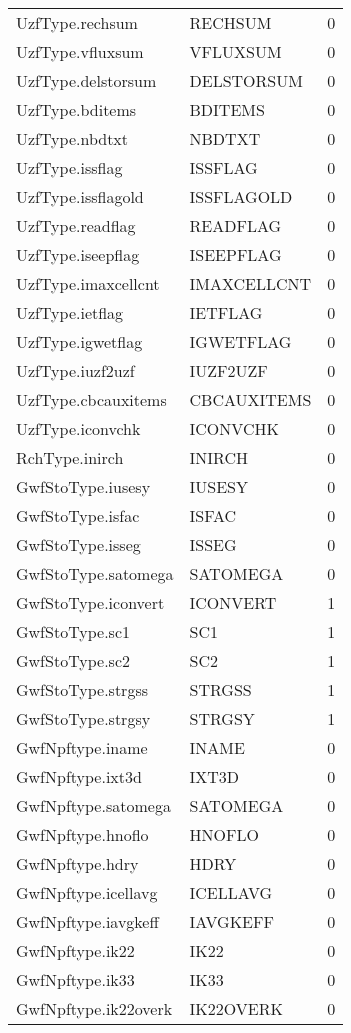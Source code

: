 \begin{longtable}{p{6cm} p{4cm} p{2cm} }
UzfType.rechsum &  RECHSUM & 0 \\ 
UzfType.vfluxsum &  VFLUXSUM & 0 \\ 
UzfType.delstorsum &  DELSTORSUM & 0 \\ 
UzfType.bditems &  BDITEMS & 0 \\ 
UzfType.nbdtxt &  NBDTXT & 0 \\ 
UzfType.issflag &  ISSFLAG & 0 \\ 
UzfType.issflagold &  ISSFLAGOLD & 0 \\ 
UzfType.readflag &  READFLAG & 0 \\ 
UzfType.iseepflag &  ISEEPFLAG & 0 \\ 
UzfType.imaxcellcnt &  IMAXCELLCNT & 0 \\ 
UzfType.ietflag &  IETFLAG & 0 \\ 
UzfType.igwetflag &  IGWETFLAG & 0 \\ 
UzfType.iuzf2uzf &  IUZF2UZF & 0 \\ 
UzfType.cbcauxitems &  CBCAUXITEMS & 0 \\ 
UzfType.iconvchk &  ICONVCHK & 0 \\ 
RchType.inirch &  INIRCH & 0 \\ 
GwfStoType.iusesy &  IUSESY & 0 \\ 
GwfStoType.isfac &  ISFAC & 0 \\ 
GwfStoType.isseg &  ISSEG & 0 \\ 
GwfStoType.satomega &  SATOMEGA & 0 \\ 
GwfStoType.iconvert &  ICONVERT & 1 \\ 
GwfStoType.sc1 &  SC1 & 1 \\ 
GwfStoType.sc2 &  SC2 & 1 \\ 
GwfStoType.strgss &  STRGSS & 1 \\ 
GwfStoType.strgsy &  STRGSY & 1 \\ 
GwfNpftype.iname &  INAME & 0 \\ 
GwfNpftype.ixt3d &  IXT3D & 0 \\ 
GwfNpftype.satomega &  SATOMEGA & 0 \\ 
GwfNpftype.hnoflo &  HNOFLO & 0 \\ 
GwfNpftype.hdry &  HDRY & 0 \\ 
GwfNpftype.icellavg &  ICELLAVG & 0 \\ 
GwfNpftype.iavgkeff &  IAVGKEFF & 0 \\ 
GwfNpftype.ik22 &  IK22 & 0 \\ 
GwfNpftype.ik33 &  IK33 & 0 \\ 
GwfNpftype.ik22overk &  IK22OVERK & 0 \\ 

\end{longtable}
